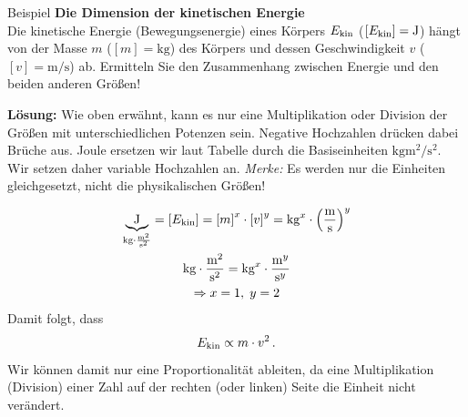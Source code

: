 \begin{examplebox}[]{Beispiel}
\textbf{Die Dimension der kinetischen Energie} \\
Die kinetische Energie (Bewegungsenergie) eines Körpers $E_\kin$ ($[E_\kin] = \si{\joule}$) hängt von der Masse $m$ ($[m] = \si{\kilo\gram}$) des Körpers und dessen Geschwindigkeit $v$ ($[v] = \si{\meter/\second}$) ab. Ermitteln Sie den Zusammenhang zwischen Energie und den beiden anderen Größen!

\textbf{Lösung:}
Wie oben erwähnt, kann es nur eine Multiplikation oder Division der Größen mit unterschiedlichen Potenzen sein. Negative Hochzahlen drücken dabei Brüche aus. Joule ersetzen wir laut Tabelle durch die Basiseinheiten $\si{\kilo\gram\meter^2/\second^2}$. Wir setzen daher variable Hochzahlen an. 
\textit{Merke:} Es werden nur die Einheiten gleichgesetzt, nicht die physikalischen Größen!

\begin{equation*}\begin{gathered}
    \underbrace{\si{\joule}}_{\si{\kilogram}\cdot \frac{\si{\meter^2}}{\si{\second^2}} } = [E_\kin] = {[m]}^x \cdot {[v]}^y = \si{\kilo\gram}^x \cdot {\left( \frac{\si{\meter}}{\si{\second}}\right)}^y \\
    \si{\kilogram}\cdot \frac{\si{\meter^2}}{\si{\second^2}} = \si{\kilogram}^x\cdot \frac{\si{\meter^y}}{\si{\second^y}} \\
    \Rightarrow x = 1,\; y = 2
\end{gathered}\end{equation*} 
Damit folgt, dass 
\begin{equation*}
    E_\kin \propto m\cdot v^2 \mDot
\end{equation*}  
Wir können damit nur eine Proportionalität ableiten, da eine Multiplikation (Division) einer Zahl auf der rechten (oder linken) Seite die Einheit nicht verändert. \QEDA
\end{examplebox}

\newpage
